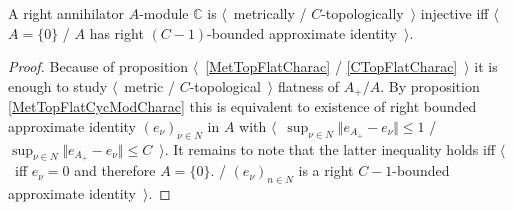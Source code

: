 \begin{proposition}\label{MetTopInjModCCharac} A right annihilator $A$-module $\mathbb{C}$ is $\langle$~metrically / $C$-topologically~$\rangle$ injective iff $\langle$~$A=\{0\}$ / $A$ has right $(C-1)$-bounded approximate identity~$\rangle$.
\end{proposition}
\begin{proof} Because of proposition $\langle$~\ref{MetTopFlatCharac} / \ref{CTopFlatCharac}~$\rangle$ it is enough to study $\langle$~metric / $C$-topological~$\rangle$ flatness of $A_+/A$. By proposition \ref{MetTopFlatCycModCharac} this is equivalent to existence of right bounded approximate identity $(e_\nu)_{\nu\in N}$ in $A$ with $\langle$~$\sup_{\nu\in N}\Vert e_{A_+}-e_\nu\Vert\leq 1$ / $\sup_{\nu\in N}\Vert e_{A_+}-e_\nu\Vert\leq C$~$\rangle$. It remains to note that the latter inequality holds iff $\langle$~iff $e_\nu=0$ and therefore $A=\{0\}$. / $(e_\nu)_{n\in N}$ is a right $C-1$-bounded approximate identity~$\rangle$.
\end{proof}

